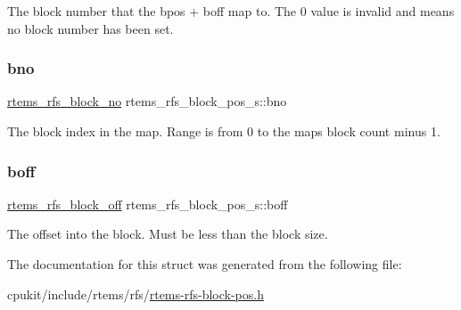 The block number that the bpos + boff map to. The 0 value is invalid and means no block number has been set. \mbox{\label{structrtems__rfs__block__pos__s_a6b59418fa37afb4f25adb19bbeb91ee6}} 
\subsubsection{\texorpdfstring{bno}{bno}}
{\footnotesize\ttfamily \mbox{\hyperlink{rtems-rfs-block-pos_8h_abbf8bb95acf9bd16ed3291f7da518e9a}{rtems\+\_\+rfs\+\_\+block\+\_\+no}} rtems\+\_\+rfs\+\_\+block\+\_\+pos\+\_\+s\+::bno}

The block index in the map. Range is from 0 to the maps block count minus 1. \mbox{\label{structrtems__rfs__block__pos__s_a319d593b6830727b0ee710fe88a05bff}} 
\subsubsection{\texorpdfstring{boff}{boff}}
{\footnotesize\ttfamily \mbox{\hyperlink{rtems-rfs-block-pos_8h_ad32ba1f9be3b667fe3e778d0edfdfff3}{rtems\+\_\+rfs\+\_\+block\+\_\+off}} rtems\+\_\+rfs\+\_\+block\+\_\+pos\+\_\+s\+::boff}

The offset into the block. Must be less than the block size. 

The documentation for this struct was generated from the following file\+:\begin{DoxyCompactItemize}
\item 
cpukit/include/rtems/rfs/\mbox{\hyperlink{rtems-rfs-block-pos_8h}{rtems-\/rfs-\/block-\/pos.\+h}}\end{DoxyCompactItemize}
